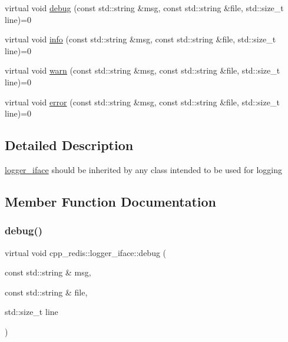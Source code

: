 \begin{DoxyCompactItemize}
virtual void \mbox{\hyperlink{classcpp__redis_1_1logger__iface_aaace9e12cbb32d7bdd76c17180a30de7}{debug}} (const std\+::string \&msg, const std\+::string \&file, std\+::size\+\_\+t line)=0
\item 
virtual void \mbox{\hyperlink{classcpp__redis_1_1logger__iface_a02e62f55d7da56efa3b47f2b05931b3b}{info}} (const std\+::string \&msg, const std\+::string \&file, std\+::size\+\_\+t line)=0
\item 
virtual void \mbox{\hyperlink{classcpp__redis_1_1logger__iface_a0ea8e43a4f2118e77af56cd1cdb21cba}{warn}} (const std\+::string \&msg, const std\+::string \&file, std\+::size\+\_\+t line)=0
\item 
virtual void \mbox{\hyperlink{classcpp__redis_1_1logger__iface_ac8353031252c80e69e35f5f131870ddf}{error}} (const std\+::string \&msg, const std\+::string \&file, std\+::size\+\_\+t line)=0
\end{DoxyCompactItemize}


\subsection{Detailed Description}
\mbox{\hyperlink{classcpp__redis_1_1logger__iface}{logger\+\_\+iface}} should be inherited by any class intended to be used for logging 

\subsection{Member Function Documentation}
\mbox{\label{classcpp__redis_1_1logger__iface_aaace9e12cbb32d7bdd76c17180a30de7}} 
\subsubsection{\texorpdfstring{debug()}{debug()}}
{\footnotesize\ttfamily virtual void cpp\+\_\+redis\+::logger\+\_\+iface\+::debug (\begin{DoxyParamCaption}\item[{const std\+::string \&}]{msg,  }\item[{const std\+::string \&}]{file,  }\item[{std\+::size\+\_\+t}]{line }\end{DoxyParamCaption})\hspace{0.3cm}{\ttfamily [pure virtual]}}

